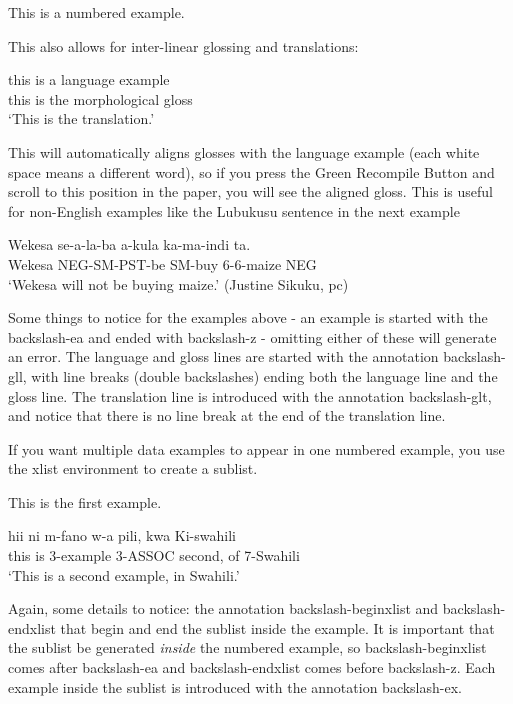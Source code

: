 \documentclass[output=paper,colorlinks,citecolor=brown,
]{langscibook}
\begin{document}
\ea 
This is a numbered example.
\z

This also allows for inter-linear glossing and translations: 

\ea 
\gll this is a language example \\
this is the morphological gloss \\
\glt `This is the translation.' 
\z 

This will automatically aligns glosses with the language example (each white space means a different word), so if you press the Green Recompile Button and scroll to this position in the paper, you will see the aligned gloss. This is useful for non-English examples like the Lubukusu sentence in the next example

\ea 
\gll Wekesa se-a-la-ba a-kula ka-ma-indi ta. \\
Wekesa NEG-SM-PST-be SM-buy 6-6-maize NEG \\ 
\glt `Wekesa will not be buying maize.' (Justine Sikuku, pc)
\z

Some things to notice for the examples above - an example is started with the backslash-ea and ended with backslash-z - omitting either of these will generate an error. The language and gloss lines are started with the annotation backslash-gll, with line breaks (double backslashes) ending both the language line and the gloss line. The translation line is introduced with the annotation backslash-glt, and notice that there is no line break at the end of the translation line.

If you want multiple data examples to appear in one numbered example, you use the xlist environment to create a sublist. 

\ea
\begin{xlist}

\ex This is the first example. 

\ex 
\gll hii ni m-fano w-a pili, kwa Ki-swahili \\
this is 3-example 3-ASSOC second, of 7-Swahili \\
\glt `This is a second example, in Swahili.' 

\end{xlist}

\z 

\noindent Again, some details to notice: the annotation backslash-begin{xlist} and backslash-end{xlist} that begin and end the sublist inside the example. It is important that the sublist be generated \textit{inside} the numbered example, so backslash-begin{xlist} comes after backslash-ea and backslash-end{xlist} comes before backslash-z. Each example inside the sublist is introduced with the annotation backslash-ex. 
\end{document}
